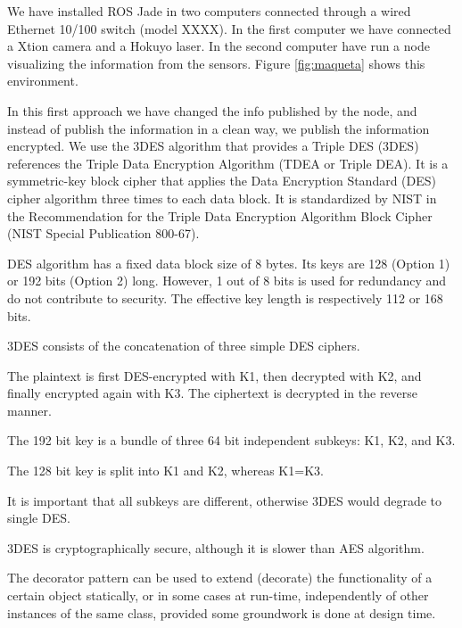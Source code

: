 \documentclass[journal,twoside]{JoPhA}
\begin{document}

We have installed ROS Jade in two computers connected through a wired Ethernet 10/100 switch (model XXXX). In the first computer we have connected a Xtion camera and a Hokuyo laser. In the second computer have run a node visualizing the information from the sensors. Figure \ref{fig:maqueta} shows this environment.



In this first approach we have changed the info published by the node, and instead of publish the information in a clean way, we publish the information encrypted.
We use the 3DES algorithm that provides a 
Triple DES (3DES) references the Triple Data Encryption Algorithm (TDEA or Triple DEA). It is a symmetric-key block cipher that applies the Data Encryption Standard (DES) cipher algorithm three times to each data block. It is standardized by NIST in the Recommendation for the Triple Data Encryption Algorithm Block Cipher (NIST Special Publication 800-67).

DES algorithm has a fixed data block size of 8 bytes. Its keys are 128 (Option 1) or 192 bits (Option 2) long. However, 1 out of 8 bits is used for redundancy and do not contribute to security. The effective key length is respectively 112 or 168 bits.

3DES consists of the concatenation of three simple DES ciphers.

The plaintext is first DES-encrypted with K1, then decrypted with K2, and finally encrypted again with K3. The ciphertext is decrypted in the reverse manner.

The 192 bit key is a bundle of three 64 bit independent subkeys: K1, K2, and K3.

The 128 bit key is split into K1 and K2, whereas K1=K3.

It is important that all subkeys are different, otherwise 3DES would degrade to single DES.

3DES is cryptographically secure, although it is slower than AES algorithm.


The decorator pattern can be used to extend (decorate) the functionality of a certain object statically, or in some cases at run-time, independently of other instances of the same class, provided some groundwork is done at design time. 
\end{document}
